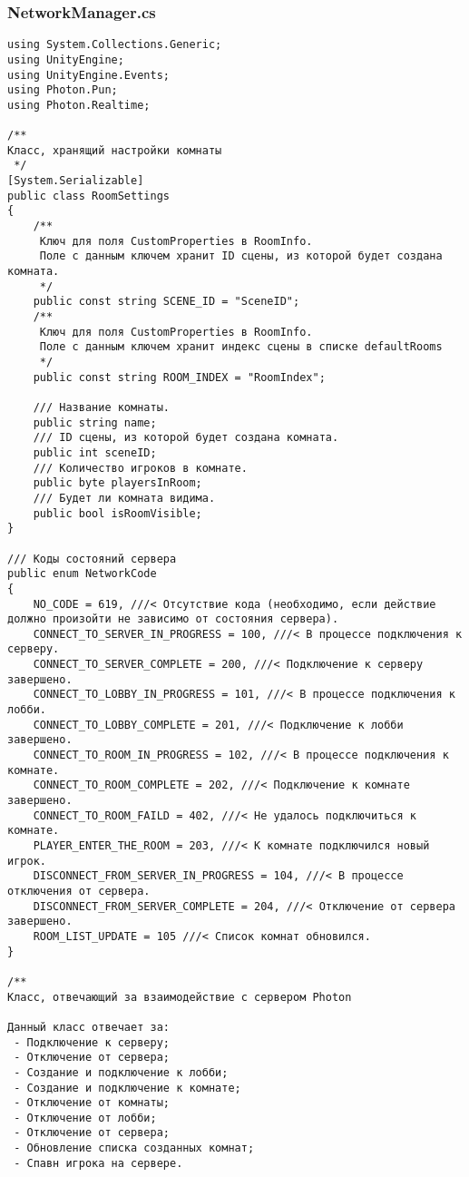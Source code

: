 \subsubsection*{NetworkManager.cs}
\begin{verbatim}
﻿using System.Collections.Generic;
using UnityEngine;
using UnityEngine.Events;
using Photon.Pun;
using Photon.Realtime;

/**
Класс, хранящий настройки комнаты
 */
[System.Serializable]
public class RoomSettings
{
    /** 
     Ключ для поля CustomProperties в RoomInfo. 
     Поле с данным ключем хранит ID сцены, из которой будет создана комната.
     */
    public const string SCENE_ID = "SceneID";
    /** 
     Ключ для поля CustomProperties в RoomInfo. 
     Поле с данным ключем хранит индекс сцены в списке defaultRooms
     */
    public const string ROOM_INDEX = "RoomIndex";

    /// Название комнаты.
    public string name;
    /// ID сцены, из которой будет создана комната.
    public int sceneID;
    /// Количество игроков в комнате.
    public byte playersInRoom;
    /// Будет ли комната видима.
    public bool isRoomVisible;
}

/// Коды состояний сервера
public enum NetworkCode
{
    NO_CODE = 619, ///< Отсутствие кода (необходимо, если действие должно произойти не зависимо от состояния сервера).
    CONNECT_TO_SERVER_IN_PROGRESS = 100, ///< В процессе подключения к серверу.
    CONNECT_TO_SERVER_COMPLETE = 200, ///< Подключение к серверу завершено.
    CONNECT_TO_LOBBY_IN_PROGRESS = 101, ///< В процессе подключения к лобби.
    CONNECT_TO_LOBBY_COMPLETE = 201, ///< Подключение к лобби завершено.
    CONNECT_TO_ROOM_IN_PROGRESS = 102, ///< В процессе подключения к комнате.
    CONNECT_TO_ROOM_COMPLETE = 202, ///< Подключение к комнате завершено.
    CONNECT_TO_ROOM_FAILD = 402, ///< Не удалось подключиться к комнате.
    PLAYER_ENTER_THE_ROOM = 203, ///< К комнате подключился новый игрок.
    DISCONNECT_FROM_SERVER_IN_PROGRESS = 104, ///< В процессе отключения от сервера.
    DISCONNECT_FROM_SERVER_COMPLETE = 204, ///< Отключение от сервера завершено.
    ROOM_LIST_UPDATE = 105 ///< Список комнат обновился.
}

/**
Класс, отвечающий за взаимодействие с сервером Photon

Данный класс отвечает за:
 - Подключение к серверу;
 - Отключение от сервера;
 - Создание и подключение к лобби;
 - Создание и подключение к комнате;
 - Отключение от комнаты;
 - Отключение от лобби;
 - Отключение от сервера;
 - Обновление списка созданных комнат;
 - Спавн игрока на сервере.


\end{verbatim}
